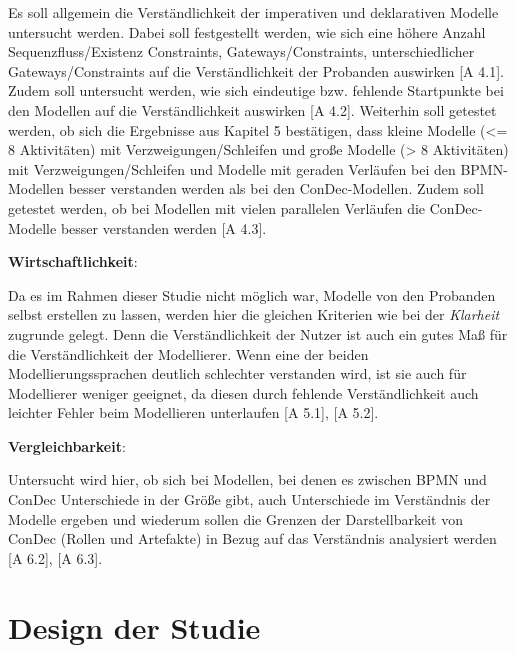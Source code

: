 Es soll allgemein die Verständlichkeit der imperativen und deklarativen Modelle untersucht werden. Dabei soll festgestellt werden, wie sich eine höhere Anzahl Sequenzfluss/Existenz Constraints, Gateways/Constraints,  unterschiedlicher Gateways/Constraints auf die Verständlichkeit der Probanden auswirken [A 4.1].\newline
Zudem soll untersucht werden, wie sich eindeutige bzw. fehlende Startpunkte bei den Modellen auf die Verständlichkeit auswirken [A 4.2].
Weiterhin soll getestet werden, ob sich die Ergebnisse aus Kapitel 5 bestätigen, dass kleine Modelle (<= 8 Aktivitäten) mit Verzweigungen/Schleifen und große Modelle (> 8 Aktivitäten) mit Verzweigungen/Schleifen und Modelle mit geraden Verläufen bei den BPMN-Modellen besser verstanden werden als bei den ConDec-Modellen.\newline
Zudem soll getestet werden, ob bei Modellen mit vielen parallelen Verläufen die ConDec- Modelle besser verstanden werden [A 4.3].\newline

\textbf{Wirtschaftlichkeit}: 

Da es im Rahmen dieser Studie nicht möglich war, Modelle von den Probanden selbst erstellen zu lassen, werden hier die gleichen Kriterien wie bei der \textit{Klarheit} zugrunde gelegt. Denn die Verständlichkeit der Nutzer ist auch ein gutes Maß für die Verständlichkeit der Modellierer. Wenn eine der beiden Modellierungssprachen deutlich schlechter verstanden wird, ist sie auch für Modellierer weniger geeignet, da diesen durch fehlende Verständlichkeit auch leichter Fehler beim Modellieren unterlaufen [A 5.1], [A 5.2].\newline

\textbf{Vergleichbarkeit}: 

Untersucht wird hier, ob sich bei Modellen, bei denen es zwischen BPMN und ConDec Unterschiede in der Größe gibt, auch Unterschiede im Verständnis der Modelle ergeben und wiederum sollen die Grenzen der Darstellbarkeit von ConDec (Rollen und Artefakte) in Bezug auf das Verständnis analysiert werden [A 6.2], [A 6.3].\newline

\section{Design der Studie}

